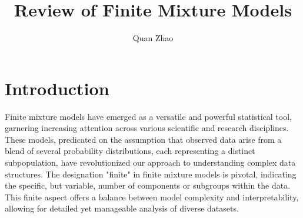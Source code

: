 \documentclass{article}
\begin{document}
\title{Review of Finite Mixture Models}

\author{Quan Zhao}

\maketitle



\section{Introduction}



%

Finite mixture models have emerged as a versatile and powerful statistical tool, garnering increasing attention across various scientific and research disciplines. These models, predicated on the assumption that observed data arise from a blend of several probability distributions, each representing a distinct subpopulation, have revolutionized our approach to understanding complex data structures. The designation "finite" in finite mixture models is pivotal, indicating the specific, but variable, number of components or subgroups within the data. This finite aspect offers a balance between model complexity and interpretability, allowing for detailed yet manageable analysis of diverse datasets.
\end{document}
